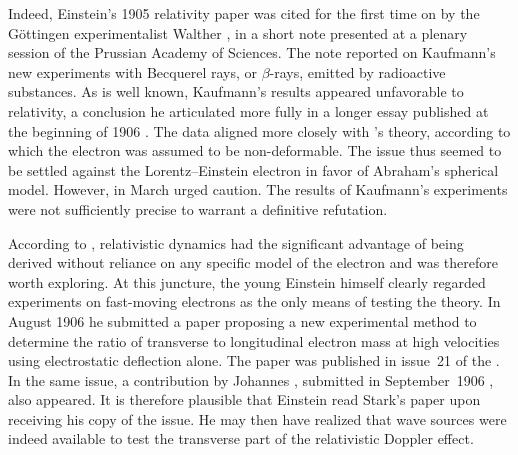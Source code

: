 \documentclass[submitted,12pt]{article} %
\providecommand{\DIFdelbegin}{} %
\providecommand{\DIFdelend}{} %
\begin{document}
Indeed, Einstein’s 1905 relativity paper was cited for the first time on  by the Göttingen experimentalist Walther \citet[954]{Kaufmann1905}, in a short note presented at a plenary session of the Prussian Academy of Sciences. The note reported on Kaufmann’s new experiments with Becquerel rays, or $\beta$-rays, emitted by radioactive substances. As is well known, Kaufmann’s results appeared unfavorable to relativity, a conclusion he articulated more fully in a longer essay published at the beginning of 1906 \citep{Kaufmann1906}. The data aligned more closely with \Abr's theory, according to which the electron was assumed to be non-deformable. The issue thus seemed to be settled against the Lorentz--Einstein electron in favor of Abraham’s spherical model. However, in March \citet{Planck1906a} urged caution. The results of Kaufmann’s experiments were not sufficiently precise to warrant a definitive refutation.

According to \citet{Planck1906}, relativistic dynamics had the significant advantage of being derived without reliance on any specific model of the electron and was therefore worth exploring. At this juncture, the young Einstein himself clearly regarded experiments on fast-moving electrons as the only means of testing the theory. In August 1906 he submitted a paper \citep{Einstein1906c} proposing a new experimental method to determine the ratio of transverse to longitudinal electron mass at high velocities using electrostatic deflection alone. The paper was published in issue~21 of the . In the same issue, a contribution by Johannes \citet{Stark1906}, submitted in September~1906\DIFdelbegin %
\DIFdelend , also appeared. It is therefore plausible that Einstein read Stark’s paper upon receiving his copy of the  issue. He may then have realized that wave sources were indeed available to test the transverse part of the relativistic Doppler effect.


\end{document}
